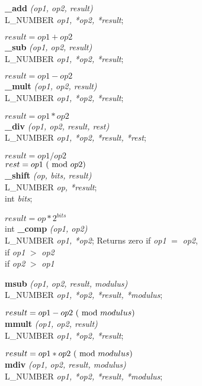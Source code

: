 {\bf \_add} {\em (op1, op2, result)} \\
L\_NUMBER {\em *op1, *op2, *result}; 

$result = op1 + op2$
\\ [1ex]

{\bf \_sub} {\em (op1, op2, result)} \\
L\_NUMBER {\em *op1, *op2, *result}; 

$result = op1 - op2$
\\ [1ex]

{\bf \_mult} {\em (op1, op2, result)} \\
L\_NUMBER {\em *op1, *op2, *result}; 

$result = op1 * op2$
\\ [1ex]

{\bf \_div} {\em (op1, op2, result, rest)} \\
L\_NUMBER {\em *op1, *op2, *result, *rest}; 

$result = op1 / op2$ \\
$rest = op1\ (\ {\rm mod }\ op2 )$
\\ [1ex]

{\bf \_shift} {\em (op, bits, result)} \\
L\_NUMBER {\em *op, *result}; \\
int {\em bits};

$result = op * 2^{bits}$
\\ [1ex]

int {\bf \_comp} {\em (op1, op2)} \\
L\_NUMBER {\em *op1, *op2}; 
\btab
Returns \1 zero \1 if {\em op1} $=$ {\em op2}, \\
         \1 if {\em op1} $>$ {\em op2} \\
         \1 if {\em op2} $>$ {\em op1} \\
\etab

{\bf msub} {\em (op1, op2, result, modulus)} \\
L\_NUMBER {\em *op1, *op2, *result, *modulus};

$result = op1 - op2\ (\ {\rm mod }\ modulus )$
\\ [1ex]

{\bf mmult} {\em (op1, op2, result)} \\
L\_NUMBER {\em *op1, *op2, *result}; 

$result = op1 * op2\ (\ {\rm mod }\ modulus )$
\\ [1ex]

{\bf mdiv} {\em (op1, op2, result, modulus)} \\
L\_NUMBER {\em *op1, *op2, *result, *modulus}; 

